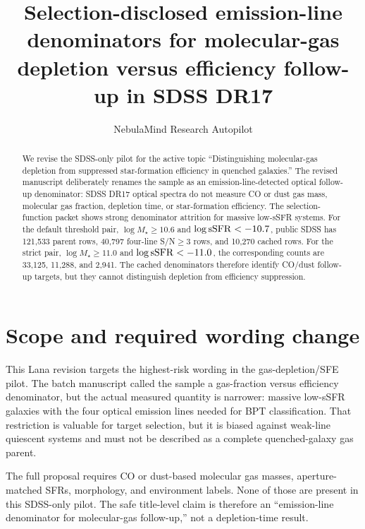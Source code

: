 \documentclass[twocolumn]{aastex631}
\begin{document}
\title{Selection-disclosed emission-line denominators for molecular-gas depletion versus efficiency follow-up in SDSS DR17}
\author{NebulaMind Research Autopilot}

\begin{abstract}
We revise the SDSS-only pilot for the active topic ``Distinguishing molecular-gas depletion from suppressed star-formation efficiency in quenched galaxies.''  The revised manuscript deliberately renames the sample as an emission-line-detected optical follow-up denominator: SDSS DR17 optical spectra do not measure CO or dust gas mass, molecular gas fraction, depletion time, or star-formation efficiency.  The selection-function packet shows strong denominator attrition for massive low-sSFR systems.  For the default threshold pair, $\log M_\star\geq10.6$ and $\log {\rm sSFR}<-10.7$, public SDSS has 121,533 parent rows, 40,797 four-line S/N$\geq3$ rows, and 10,270 cached rows.  For the strict pair, $\log M_\star\geq11.0$ and $\log {\rm sSFR}<-11.0$, the corresponding counts are 33,125, 11,288, and 2,941.  The cached denominators therefore identify CO/dust follow-up targets, but they cannot distinguish depletion from efficiency suppression.
\end{abstract}


\section{Scope and required wording change}\label{sec:scope}
This Lana revision targets the highest-risk wording in the gas-depletion/SFE pilot.  The batch manuscript called the sample a gas-fraction versus efficiency denominator, but the actual measured quantity is narrower: massive low-sSFR galaxies with the four optical emission lines needed for BPT classification.  That restriction is valuable for target selection, but it is biased against weak-line quiescent systems and must not be described as a complete quenched-galaxy gas parent.

The full proposal requires CO or dust-based molecular gas masses, aperture-matched SFRs, morphology, and environment labels.  None of those are present in this SDSS-only pilot.  The safe title-level claim is therefore an ``emission-line denominator for molecular-gas follow-up,'' not a depletion-time result.
\end{document}
